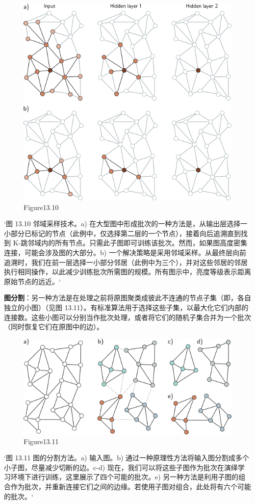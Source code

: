\begin{figure}[ht!]
\centering
\includegraphics[width=0.7\linewidth]{png/chapter13/GraphSampling.png}
\caption{Figure13.10}
\end{figure}

`图 13.10 邻域采样技术。a) 在大型图中形成批次的一种方法是，从输出层选择一小部分已标记的节点（此例中，仅选择第二层的一个节点），接着向后追溯直到找到 K-跳邻域内的所有节点。只需此子图即可训练该批次。然而，如果图高度密集连接，可能会涉及图的大部分。b) 一个解决策略是采用邻域采样。从最终层向前追溯时，我们在前一层选择一小部分邻居（此例中为三个），并对这些邻居的邻居执行相同操作，以此减少训练批次所需图的规模。所有图示中，亮度等级表示距离原始节点的远近。`

\textbf{图分割}：另一种方法是在处理之前将原图聚类成彼此不连通的节点子集（即，各自独立的小图）（见图 13.11）。有标准算法用于选择这些子集，以最大化它们内部的连接数。这些小图可以分别当作批次处理，或者将它们的随机子集合并为一个批次（同时恢复它们在原图中的边）。

\begin{figure}[ht!]
\centering
\includegraphics[width=0.7\linewidth]{png/chapter13/GraphPartitioning.png}
\caption{Figure13.11}
\end{figure}

`图 13.11 图的分割方法。a) 输入图。b) 通过一种原理性方法将输入图分割成多个小子图，尽量减少切断的边。c-d) 现在，我们可以将这些子图作为批次在演绎学习环境下进行训练，这里展示了四个可能的批次。e) 另一种方法是利用子图的组合作为批次，并重新连接它们之间的边缘。若使用子图对组合，此处将有六个可能的批次。`

